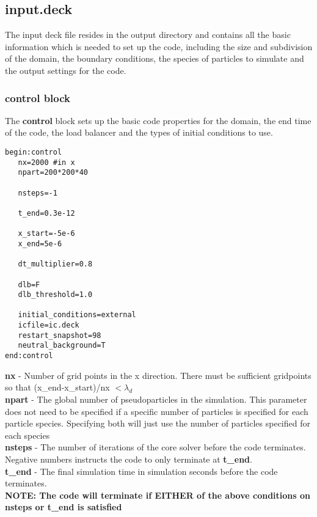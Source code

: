 \documentclass[12pt]{article}
\newcommand{\emphtext}{\color{warwickdark} \fontfamily{phv}\selectfont\Large\bf}
\newcommand{\inlineemph}{\color{warwicklight} \bf}
\newcommand{\boxverbatim}[1]{\begin{Verbatim}[obeytabs=true,frame=single,
  framerule=0.5mm,rulecolor=\color{warwickmid},label=#1]}
\begin{document}
\subsection{input.deck}
The input deck file resides in the output directory and contains all the basic
information which is needed to set up the code, including the size and
subdivision of the domain, the boundary conditions, the species of particles to
simulate and the output settings for the code.

\subsubsection{{\inlineemph control} block}
The {\inlineemph control} block sets up the basic code properties for the
domain, the end time of the code, the load balancer and the types of initial
conditions to use.

\boxverbatim{control block}
begin:control
   nx=2000 #in x
   npart=200*200*40

   nsteps=-1

   t_end=0.3e-12

   x_start=-5e-6
   x_end=5e-6

   dt_multiplier=0.8

   dlb=F
   dlb_threshold=1.0

   initial_conditions=external
   icfile=ic.deck
   restart_snapshot=98
   neutral_background=T
end:control
\end{Verbatim}


{\emphtext nx} - Number of grid points in the x direction. There must be
sufficient gridpoints so that (x\_end-x\_start)/nx $< \lambda_d$\\

{\emphtext npart} - The global number of pseudoparticles in the
simulation. This parameter does not need to be specified if a specific number
of particles is specified for each particle species. Specifying both will just
use the number of particles specified for each species\\

{\emphtext nsteps} - The number of iterations of the core solver before the
code terminates. Negative numbers instructs the code to only terminate at
{\inlineemph t\_end}.\\

{\emphtext t\_end} - The final simulation time in simulation seconds before the
code terminates.\\

{\emphtext NOTE: The code will terminate if EITHER of the above conditions on
nsteps or t\_end is satisfied}\\
\end{document}
